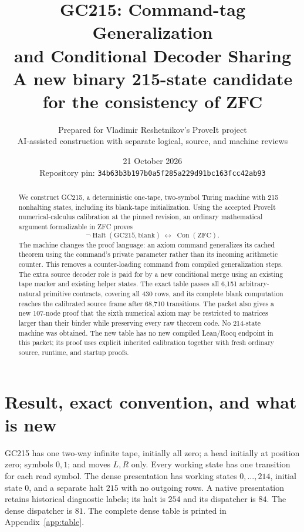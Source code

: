 \documentclass[10pt,a4paper]{article}
\title{\vspace{-1.5em}\textbf{GC215: Command-tag Generalization\\and Conditional Decoder Sharing}\\[0.5em]
\large A new binary 215-state candidate for the consistency of ZFC}
\author{Prepared for Vladimir Reshetnikov's ProveIt project\\
\small AI-assisted construction with separate logical, source, and machine reviews}
\date{21 October 2026\\\small Repository pin: \texttt{34b63b3b197b0a5f285a229d91bc163fcc42ab93}}
\newcommand{\Con}{\operatorname{Con}}
\newcommand{\Halt}{\operatorname{Halt}}
\begin{document}
\maketitle
\begin{abstract}
We construct GC215, a deterministic one-tape, two-symbol Turing machine with
215 nonhalting states, including its blank-tape initialization.  Using the
accepted ProveIt numerical-calculus calibration at the pinned revision, an
ordinary mathematical argument formalizable in ZFC proves
\[
 \neg\Halt(\mathrm{GC215},\mathrm{blank})\ \longleftrightarrow\ \Con(\mathrm{ZFC}).
\]
The machine changes the proof language: an axiom command generalizes its cached
theorem using the command's private parameter rather than its incoming
arithmetic counter.  This removes a counter-loading command from compiled
generalization steps.  The extra source decoder role is paid for by a new
conditional merge using an existing tape marker and existing helper states.
The exact table passes all 6,151 arbitrary-natural primitive contracts,
covering all 430 rows, and its complete blank computation reaches the
calibrated source frame after 68,710 transitions.  The packet also gives a new
107-node proof that the sixth numerical axiom may be restricted to matrices
larger than their binder while preserving every raw theorem code.
No 214-state machine was obtained.  The new table has no new compiled
Lean/Rocq endpoint in this packet; its proof uses explicit inherited
calibration together with fresh ordinary source, runtime, and startup proofs.
\end{abstract}

\clearpage
\tableofcontents
\clearpage

\section{Result, exact convention, and what is new}

GC215 has one two-way infinite tape, initially all zero; a head initially at
position zero; symbols $0,1$; and moves $L,R$ only.  Every working state has
one transition for each read symbol.  The dense presentation has working
states $0,\ldots,214$, initial state $0$, and a separate halt $215$ with no
outgoing rows.  A native presentation retains historical diagnostic labels;
its halt is $254$ and its dispatcher is $84$.  The dense dispatcher is $81$.
The complete dense table is printed in Appendix~\ref{app:table}.
\end{document}
